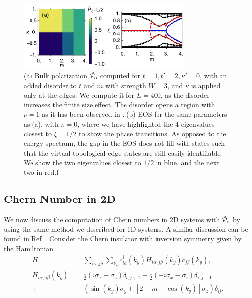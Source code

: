 \documentclass[twocolumn,amsmath,longbibliography,amssymb,superscriptaddress]{revtex4-1}
\newcommand{\tpo}{\tilde{\mathcal{P}}_{\rm o}}
\begin{document}
\begin{figure}[t]
\includegraphics[width=86mm]{fig8comp.pdf}
\caption{(a) Bulk polarization $\tpo$ computed for $t=1,t'=2,\kappa'=0$, with an added disorder to $t$ and $m$ with strength $W=3$, and $\kappa$ is applied only at the edges. We compute it for $L=400$, as the disorder increases the finite size  effect. The disorder opens a region with $\nu=1$ as it has been observed in \cite{Song2014}. (b) EOS for the same parameters as (a), with $\kappa=0$, where we have highlighted the 4 eigenvalues closest to $\xi = 1/2$ to show the phase transitions. As opposed to the energy spectrum, the gap in the EOS does not fill with states such that the virtual topological edge states are still easily identifiable. We show the two eigenvalues closest to $1/2$ in blue, and the next two in red.f }
	\label{disorder_chern}
\end{figure}

\subsection{Chern Number in 2D}

We now discuss the computation of Chern numbers in 2D systems with $\tpo$ by using the same method we described for 1D systems. A similar  discussion can be found in Ref~\cite{Alexandrinata2011}.
 Consider the Chern insulator with inversion symmetry given by the Hamiltonian
\begin{align}
H =& \sum_{i\alpha,j\beta}\sum_{k_y} c_{i\alpha}^\dagger(k_y) H_{i\alpha,j\beta}(k_y) c_{j\beta}(k_y), \\ \nonumber
H_{i\alpha,j\beta}(k_y)=& \frac{1}{2}(i\sigma_x-\sigma_z)\delta_{i,j+1}+\frac{1}{2}(-i\sigma_x-\sigma_z)\delta_{i,j-1} \nonumber\\
+&(\sin(k_y)\sigma_y+[2-m-\cos(k_y)]\sigma_z) \delta_{ij}.
\label{eq:chern_model}
\end{align}
\end{document}
